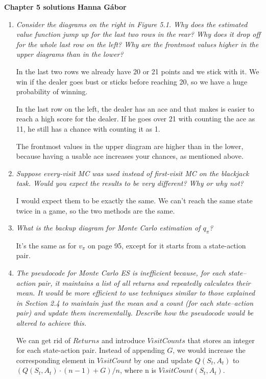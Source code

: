 \documentclass[12pt,a4paper]{article}
\begin{document}
\textbf{Chapter 5 solutions  \hfill Hanna Gábor}

\begin{enumerate}
  \item
    \textit{Consider the diagrams on the right in Figure 5.1. Why does the estimated
    value function jump up for the last two rows in the rear? Why does it drop off for the
    whole last row on the left? Why are the frontmost values higher in the upper diagrams
    than in the lower?}

    In the last two rows we already have 20 or 21 points and we stick with it. We win if
    the dealer goes bust or sticks before reaching 20, so we have a huge probability
    of winning.

    In the last row on the left, the dealer has an ace and that makes is easier to reach
    a high score for the dealer. If he goes over 21 with counting the ace as 11,
    he still has a chance with counting it as 1.

    The frontmost values in the upper diagram are higher than in the lower, because
    having a usable ace increases your chances, as mentioned above.

  \item
    \textit{Suppose every-visit MC was used instead of first-visit MC on the blackjack
      task. Would you expect the results to be very different? Why or why not?}

    I would expect them to be exactly the same. We can't reach the same state twice in a game,
    so the two methods are the same.

  \item
    \textit{What is the backup diagram for Monte Carlo estimation of $q_\pi$?}

    It's the same as for $v_\pi$ on page 95, except for it starts from a state-action pair.

  \item
    \textit{The pseudocode for Monte Carlo ES is inefficient because, for each state–action
    pair, it maintains a list of all returns and repeatedly calculates their mean. It would
    be more efficient to use techniques similar to those explained in Section 2.4 to maintain
    just the mean and a count (for each state–action pair) and update them incrementally.
    Describe how the pseudocode would be altered to achieve this.}

    We can get rid of $Returns$ and introduce $VisitCounts$ that stores an integer
    for each state-action pair. Instead of appending $G$, we would increase the
    corresponding element in $VisitCount$ by one and update $Q(S_t, A_t)$ to
    $(Q(S_t, A_t) \cdot (n - 1) + G)/ n$, where n is $VisitCount(S_t, A_t)$. 


\end{enumerate}
\end{document}
